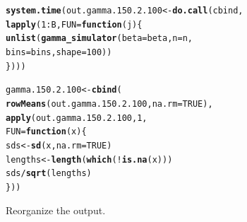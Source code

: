 \documentclass[11pt]{article}\usepackage[]{graphicx}\usepackage[]{color}
\makeatletter
\newcommand{\hlnum}[1]{\textcolor[rgb]{0.686,0.059,0.569}{#1}}%
\newcommand{\hlopt}[1]{\textcolor[rgb]{0,0,0}{#1}}%
\newcommand{\hlstd}[1]{\textcolor[rgb]{0.345,0.345,0.345}{#1}}%
\newcommand{\hlkwa}[1]{\textcolor[rgb]{0.161,0.373,0.58}{\textbf{#1}}}%
\newcommand{\hlkwb}[1]{\textcolor[rgb]{0.69,0.353,0.396}{#1}}%
\newcommand{\hlkwc}[1]{\textcolor[rgb]{0.333,0.667,0.333}{#1}}%
\newcommand{\hlkwd}[1]{\textcolor[rgb]{0.737,0.353,0.396}{\textbf{#1}}}%
\newenvironment{kframe}{%
 \def\at@end@of@kframe{}%
 \ifinner\ifhmode%
  \def\at@end@of@kframe{\end{minipage}}%
  \begin{minipage}{\columnwidth}%
 \fi\fi%
 \def\FrameCommand##1{\hskip\@totalleftmargin \hskip-\fboxsep
 \colorbox{shadecolor}{##1}\hskip-\fboxsep
     \hskip-\linewidth \hskip-\@totalleftmargin \hskip\columnwidth}%
 \MakeFramed {\advance\hsize-\width
   \@totalleftmargin\z@ \linewidth\hsize
   \@setminipage}}%
 {\par\unskip\endMakeFramed%
 \at@end@of@kframe}
\newenvironment{knitrout}{}{} %
\makeatother
\begin{document}
\begin{knitrout}
\color{fgcolor}\begin{kframe}
\begin{alltt}
\hlkwd{system.time}\hlstd{(out.gamma.150.2.100} \hlkwb{<-} \hlkwd{do.call}\hlstd{(cbind,}
  \hlkwd{lapply}\hlstd{(}\hlnum{1}\hlopt{:}\hlstd{B,} \hlkwc{FUN} \hlstd{=} \hlkwa{function}\hlstd{(}\hlkwc{j}\hlstd{)\{}
    \hlkwd{unlist}\hlstd{(}\hlkwd{gamma_simulator}\hlstd{(}\hlkwc{beta} \hlstd{= beta,} \hlkwc{n} \hlstd{= n,}
      \hlkwc{bins} \hlstd{= bins,} \hlkwc{shape} \hlstd{=} \hlnum{100}\hlstd{))}
\hlstd{\})))}
\end{alltt}


{\ttfamily\noindent\bfseries\color{errorcolor}{\#\# Error in eval(family\$initialize): non-positive values not allowed for the 'gamma' family}}

{\ttfamily\noindent\itshape\color{messagecolor}{\#\# Timing stopped at: 0.007 0 0.007}}\end{kframe}
\end{knitrout}

\begin{knitrout}
\color{fgcolor}\begin{kframe}
\begin{alltt}
\hlstd{gamma.150.2.100} \hlkwb{<-} \hlkwd{cbind}\hlstd{(}
  \hlkwd{rowMeans}\hlstd{(out.gamma.150.2.100,} \hlkwc{na.rm} \hlstd{=} \hlnum{TRUE}\hlstd{),}
  \hlkwd{apply}\hlstd{(out.gamma.150.2.100,} \hlnum{1}\hlstd{,}
  \hlkwc{FUN} \hlstd{=} \hlkwa{function}\hlstd{(}\hlkwc{x}\hlstd{)\{}
    \hlstd{sds} \hlkwb{<-} \hlkwd{sd}\hlstd{(x,} \hlkwc{na.rm} \hlstd{=} \hlnum{TRUE}\hlstd{)}
    \hlstd{lengths} \hlkwb{<-} \hlkwd{length}\hlstd{(}\hlkwd{which}\hlstd{(}\hlopt{!}\hlkwd{is.na}\hlstd{(x)))}
    \hlstd{sds} \hlopt{/} \hlkwd{sqrt}\hlstd{(lengths)}
  \hlstd{\}))}
\end{alltt}


{\ttfamily\noindent\bfseries\color{errorcolor}{\#\# Error in is.data.frame(x): object 'out.gamma.150.2.100' not found}}\end{kframe}
\end{knitrout}


Reorganize the output.
\end{document}
